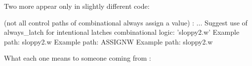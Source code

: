 
Two more appear only in slightly different code:

\begin{txtcode}
                (not all control paths of combinational always assign
                 a value)
                : ... Suggest use of always_latch for intentional latches
                    combinational logic: 'sloppy2.w'
                    Example path: sloppy2.w
                    Example path: ASSIGNW
                    Example path: sloppy2.w
\end{txtcode}

What each one means to someone coming from \VHDL{}:

